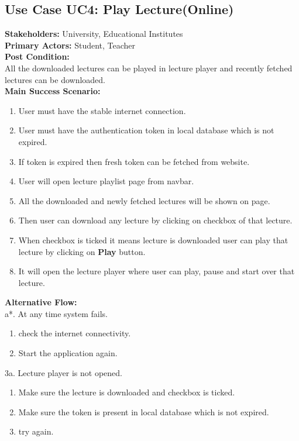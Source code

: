 \subsection{Use Case UC4: Play Lecture(Online)}
\textbf{Stakeholders: } University, Educational Institutes \\
\textbf{Primary Actors: } Student, Teacher \\
\textbf{Post Condition: }\\
All the downloaded lectures can be played in lecture player and recently fetched lectures can be downloaded.\\
\textbf{Main Success Scenario: }
\begin{enumerate}
\item User must have the stable internet connection.
\item User must have the authentication token in local database which is not expired.
\item If token is expired then fresh token can be fetched from website.
\item User will open lecture playlist page from navbar.
\item All the downloaded and newly fetched lectures will be shown on page.
\item Then user can download any lecture by clicking on checkbox of that lecture.
\item When checkbox is ticked it means lecture is downloaded user can play that lecture by clicking on \textbf{Play} button.
\item It will open the lecture player where user can play, pause and start over that lecture.

\end{enumerate}
\textbf{Alternative Flow: }\\
a*. At any time system fails.
\begin{enumerate}
\item check the internet connectivity.
\item Start the application again.
\end{enumerate}
3a. Lecture player is not opened.
\begin{enumerate}
\item Make sure the lecture is downloaded and checkbox is ticked.
\item Make sure the token is present in local database which is not expired.
\item try again.
\end{enumerate}


